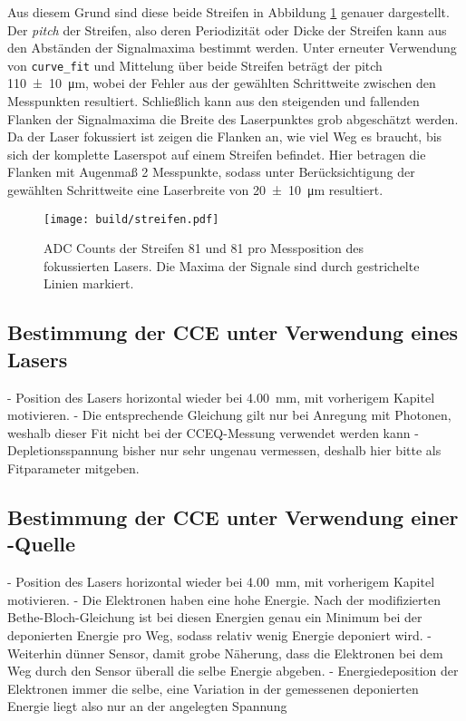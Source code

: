 Aus diesem Grund sind diese beide Streifen in Abbildung \ref{fig:streifen}
genauer dargestellt. Der \emph{pitch} der Streifen, also deren Periodizität oder
Dicke der Streifen kann aus den Abständen der Signalmaxima bestimmt werden.
Unter erneuter Verwendung von \texttt{curve\_fit} und Mittelung über beide Streifen
beträgt der pitch \SI{110(10)}{\micro\meter}, wobei der Fehler aus der gewählten
Schrittweite zwischen den Messpunkten resultiert.
Schließlich kann aus den steigenden und fallenden Flanken der Signalmaxima die
Breite des Laserpunktes grob abgeschätzt werden.
Da der Laser fokussiert ist zeigen die Flanken an, wie viel Weg es braucht, bis
sich der komplette Laserspot auf einem Streifen befindet.
Hier betragen die Flanken mit Augenmaß 2 Messpunkte, sodass unter Berücksichtigung
der gewählten Schrittweite eine Laserbreite von \SI{20(10)}{\micro\meter} resultiert.
\begin{figure}
  \centering
  \texttt{[image: build/streifen.pdf]}  %
  \caption{ADC Counts der Streifen 81 und 81 pro Messposition des fokussierten
  Lasers. Die Maxima der Signale sind durch gestrichelte Linien markiert.}
  \label{fig:streifen}
\end{figure}

\FloatBarrier
\subsection{Bestimmung der CCE unter Verwendung eines Lasers}
\label{sec:CCEL-Auswertung}

- Position des Lasers horizontal wieder bei \SI{4.00}{\milli\meter}, mit vorherigem
Kapitel motivieren.
- Die entsprechende Gleichung gilt nur bei Anregung mit Photonen, weshalb dieser Fit
nicht bei der CCEQ-Messung verwendet werden kann
- Depletionsspannung bisher nur sehr ungenau vermessen, deshalb hier bitte als
Fitparameter mitgeben.

\FloatBarrier
\subsection{Bestimmung der CCE unter Verwendung einer \texorpdfstring{}{Sr}-Quelle}
\label{sec:CCEQ-Auswertung}

- Position des Lasers horizontal wieder bei \SI{4.00}{\milli\meter}, mit vorherigem
Kapitel motivieren.
- Die Elektronen haben eine hohe Energie. Nach der modifizierten Bethe-Bloch-Gleichung
ist bei diesen Energien genau ein Minimum bei der deponierten Energie pro Weg, sodass
relativ wenig Energie deponiert wird.
- Weiterhin dünner Sensor, damit grobe Näherung, dass die Elektronen bei dem Weg durch
den Sensor überall die selbe Energie abgeben.
- Energiedeposition der Elektronen immer die selbe, eine Variation in der gemessenen
deponierten Energie liegt also nur an der angelegten Spannung

